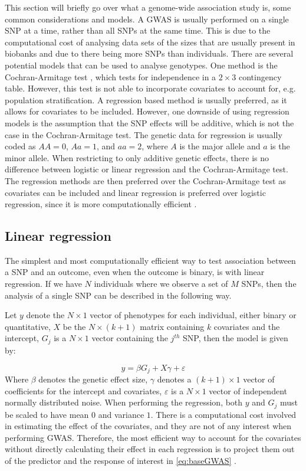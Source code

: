 This section will briefly go over what a genome-wide association study is, some common considerations and models. A GWAS is usually performed on a single SNP at a time, rather than all SNPs at the same time. This is due to the computational cost of analysing data sets of the sizes that are usually present in biobanks and due to there being more SNPs than individuals. There are several potential models that can be used to analyse genotypes. One method is the Cochran-Armitage test \cite{cochran1954some,armitageTest}, which tests for independence in a $ 2\times3 $ contingency table. However, this test is not able to incorporate covariates to account for, e.g. population stratification. A regression based method is usually preferred, as it allows for covariates to be included. However, one downside of using regression models is the assumption that the SNP effects will be additive, which is not the case in the Cochran-Armitage test. The genetic data for regression is usually coded as $ AA = 0 $, $ Aa = 1 $, and $ aa = 2 $, where $ A $ is the major allele and $ a $ is the minor allele\cite{zeng2015statistical}. When restricting to only additive genetic effects, there is no difference between logistic or linear regression and the Cochran-Armitage test. The regression methods are then preferred over the Cochran-Armitage test as covariates can be included and linear regression is preferred over logistic regression, since it is more computationally efficient \cite{sikorska2013gwas,prive2019making}.


\subsection{Linear regression}
The simplest and most computationally efficient way to test association between a SNP and an outcome, even when the outcome is binary, is with linear regression. If we have $ N $ individuals where we observe a set of $ M $ SNPs, then the analysis of a single SNP can be described in the following way.

Let $ y $ denote the $ N\times1 $ vector of phenotypes for each individual, either binary or quantitative, $ X $ be the $ N \times (k+1) $ matrix containing $ k $ covariates and the intercept, $ G_j $ is a $ N\times 1 $ vector containing the $ j^{th} $ SNP, then the model is given by:

\begin{equation}\label{eq:baseGWAS}
y = \beta G_{j} +  X\gamma + \varepsilon
\end{equation}
Where $ \beta $ denotes the genetic effect size, $ \gamma $ denotes a $ (k + 1) \times 1$ vector of coefficients for the intercept and covariates, $ \varepsilon $ is a $ N \times 1 $ vector of independent normally distributed noise. When performing the regression, both $ y $ and $ G_j $ must be scaled to have mean $ 0 $ and variance $ 1 $. There is a computational cost involved in estimating the effect of the covariates, and they are not of any interest when performing GWAS. Therefore, the most efficient way to account for the covariates without directly calculating their effect in each regression is to project them out of the predictor and the response of interest in \cref{eq:baseGWAS} \cite{sikorska2013gwas}.

